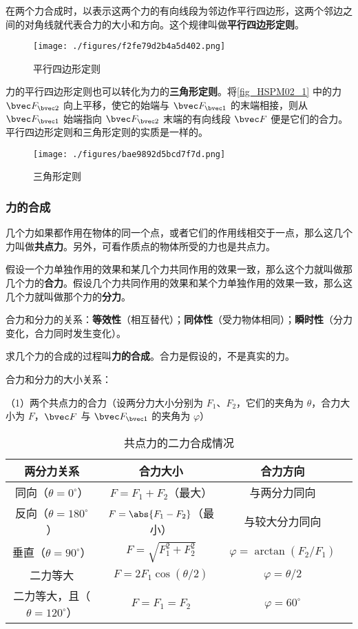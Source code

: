 在两个力合成时，以表示这两个力的有向线段为邻边作平行四边形，这两个邻边之间的对角线就代表合力的大小和方向。这个规律叫做\textbf{平行四边形定则}。
\begin{figure}[ht]
\centering
\texttt{[image: ./figures/f2fe79d2b4a5d402.png]}
\caption{平行四边形定则} \label{fig_HSPM02_1}
\end{figure}

力的平行四边形定则也可以转化为力的\textbf{三角形定则}。将\autoref{fig_HSPM02_1} 中的力 $\bvec F_{\bvec 2}$ 向上平移，使它的始端与 $\bvec F_{\bvec 1}$ 的末端相接，则从 $\bvec F_{\bvec 1}$ 始端指向 $\bvec F_{\bvec 2}$ 末端的有向线段 $\bvec F$ 便是它们的合力。平行四边形定则和三角形定则的实质是一样的。
\begin{figure}[ht]
\centering
\texttt{[image: ./figures/bae9892d5bcd7f7d.png]}
\caption{三角形定则} \label{fig_HSPM02_2}
\end{figure}

\subsubsection{力的合成}
几个力如果都作用在物体的同一个点，或者它们的作用线相交于一点，那么这几个力叫做\textbf{共点力}。另外，可看作质点的物体所受的力也是共点力。

假设一个力单独作用的效果和某几个力共同作用的效果一致，那么这个力就叫做那几个力的\textbf{合力}。假设几个力共同作用的效果和某个力单独作用的效果一致，那么这几个力就叫做那个力的\textbf{分力}。

合力和分力的关系：\textbf{等效性}（相互替代）；\textbf{同体性}（受力物体相同）；\textbf{瞬时性}（分力变化，合力同时发生变化）。

求几个力的合成的过程叫\textbf{力的合成}。合力是假设的，不是真实的力。

合力和分力的大小关系：

（1）两个共点力的合力（设两分力大小分别为 $F_1$、$F_2$，它们的夹角为 $\theta$，合力大小为 $F$，$\bvec F$ 与 $\bvec F_{\bvec 1}$ 的夹角为 $\varphi $）

\begin{table}[ht]
\centering
\caption{共点力的二力合成情况}\label{tab_HSPM02_1}
\begin{tabular}{|c|c|c|c|}
\hline
两分力关系 &  合力大小 & 合力方向 \\
\hline
同向（$\theta=0^{\circ}$） &  $F=F_1+F_2$（最大） & 与两分力同向 \\
\hline
反向（$\theta=180^{\circ}$） &  $F=\abs{F_1-F_2}$（最小） & 与较大分力同向 \\
\hline
垂直（$\theta=90^{\circ}$） &  $F=\sqrt{F_1^2+F_2^2}$ & $\varphi=\arctan{(F_2/F_1)}$ \\
\hline
二力等大 &  $F=2F_1\cos{(\theta/2)}$ & $\varphi=\theta/2$ \\
\hline
二力等大，且（$\theta=120^{\circ}$） &  $F=F_1=F_2$ & $\varphi=60^{\circ}$ \\
\hline
\end{tabular}
\end{table}

